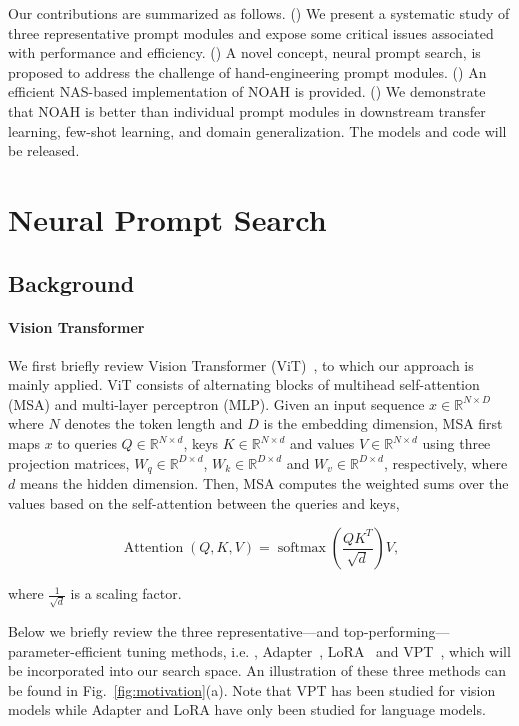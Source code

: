 Our contributions are summarized as follows. () We present a systematic study of three representative prompt modules and expose some critical issues associated with performance and efficiency. () A novel concept, neural prompt search, is proposed to address the challenge of hand-engineering prompt modules. () An efficient NAS-based implementation of NOAH is provided. () We demonstrate that NOAH is better than individual prompt modules in downstream transfer learning, few-shot learning, and domain generalization. The models and code will be released.

\section{Neural Prompt Search}
\label{sec:method}

\subsection{Background}
\label{sec:method;subsec:bg}

\paragraph{Vision Transformer} We first briefly review Vision Transformer (ViT)~\cite{dosovitskiy2020image}, to which our approach is mainly applied. ViT consists of alternating blocks of multihead self-attention (MSA) and multi-layer perceptron (MLP). Given an input sequence $x \in \mathbb{R}^{N \times D}$ where $N$ denotes the token length and $D$ is the embedding dimension, MSA first maps $x$ to queries $Q \in \mathbb{R}^{N \times d}$, keys $K \in \mathbb{R}^{N \times d}$ and values $V \in \mathbb{R}^{N \times d}$ using three projection matrices, $W_q \in \mathbb{R}^{D \times d}$, $W_k \in \mathbb{R}^{D \times d}$ and $W_v \in \mathbb{R}^{D \times d}$, respectively, where $d$ means the hidden dimension. Then, MSA computes the weighted sums over the values based on the self-attention between the queries and keys,

\begin{equation}\label{eq:msa}
\operatorname{Attention}(Q, K, V) = \operatorname{softmax}(\frac{QK^T}{\sqrt{d}})V,
\end{equation}

where $\frac{1}{\sqrt{d}}$ is a scaling factor.

Below we briefly review the three representative---and top-performing---parameter-efficient tuning methods, i.e. , Adapter~\cite{houlsby2019parameter}, LoRA~\cite{hu2021lora} and VPT~\cite{jia2022visual}, which will be incorporated into our search space. An illustration of these three methods can be found in Fig.~\ref{fig:motivation}(a). Note that VPT has been studied for vision models while Adapter and LoRA have only been studied for language models.

